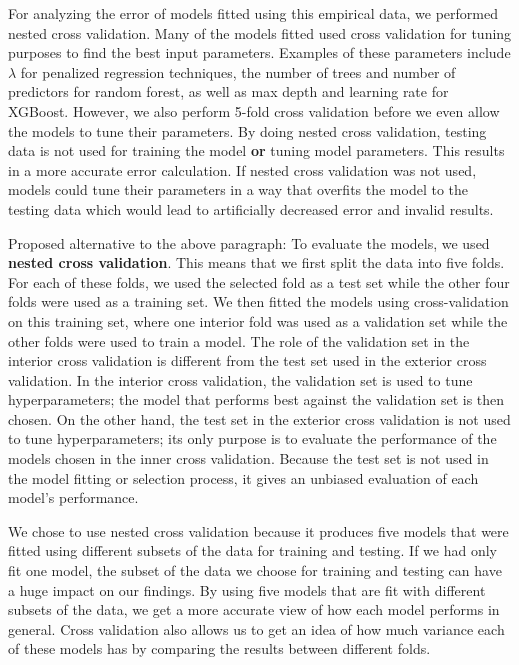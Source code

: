 \documentclass{article}
\begin{document}
For analyzing the error of models fitted using this empirical data, we performed nested cross validation. Many of the models fitted used cross validation for tuning purposes to find the best input parameters. Examples of these parameters include $\lambda$ for penalized regression techniques, the number of trees and number of predictors for random forest, as well as max depth and learning rate for XGBoost. However, we also perform 5-fold cross validation before we even allow the models to tune their parameters. By doing nested cross validation, testing data is not used for training the model \textbf{or} tuning model parameters. This results in a more accurate error calculation. If nested cross validation was not used, models could tune their parameters in a way that overfits the model to the testing data which would lead to artificially decreased error and invalid results.

Proposed alternative to the above paragraph: To evaluate the models, we used \textbf{nested cross validation}. This means that we first split the data into five folds. For each of these folds, we used the selected fold as a test set while the other four folds were used as a training set. We then fitted the models using cross-validation on this training set, where one interior fold was used as a validation set while the other folds were used to train a model. The role of the validation set in the interior cross validation is different from the test set used in the exterior cross validation. In the interior cross validation, the validation set is used to tune hyperparameters; the model that performs best against the validation set is then chosen. On the other hand, the test set in the exterior cross validation is not used to tune hyperparameters; its only purpose is to evaluate the performance of the models chosen in the inner cross validation. Because the test set is not used in the model fitting or selection process, it gives an unbiased evaluation of each model's performance.

We chose to use nested cross validation because it produces five models that were fitted using different subsets of the data for training and testing. If we had only fit one model, the subset of the data we choose for training and testing can have a huge impact on our findings. By using five models that are fit with different subsets of the data, we get a more accurate view of how each model performs in general. Cross validation also allows us to get an idea of how much variance each of these models has by comparing the results between different folds.
\end{document}
